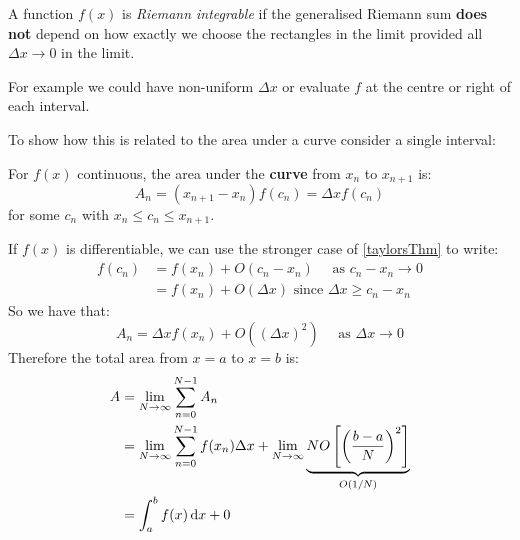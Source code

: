 \documentclass[../main.tex]{subfiles}
\begin{document}
\begin{definition}
  A function $f(x)$ is \textit{Riemann integrable} if the generalised Riemann sum \textbf{does not} depend on how exactly we choose the rectangles in the limit provided all $\Delta x \to 0$ in the limit.

  For example we could have non-uniform $\Delta x$ or evaluate $f$ at the centre or right of each interval.
\end{definition}
To show how this is related to the area under a curve consider a single interval:
\begin{center}
\end{center}
\begin{theorem}
  For $f(x)$ continuous, the area under the \textbf{curve} from $x_n$ to $x_{n + 1}$ is:
  \[
    A_n = (x_{n+1}-x_n)f(c_n) = \Delta x f(c_n)
    \label{meanValue}
  \]
  for some $c_n$ with $x_n \leq c_n \leq x_{n+1}$.
\end{theorem}
If $f(x)$ is differentiable, we can use the stronger case of \cref{taylorsThm} to write:
\begin{align*}
  f(c_n) &= f(x_n) + O(c_n - x_n) \quad \text{ as } c_n - x_n \to 0 \\
         &= f(x_n) + O(\Delta x) \text{ since $\Delta x \geq c_n - x_n$}
\end{align*}
So we have that:
\[
  A_n = \Delta x f(x_n) + O((\Delta x)^2) \quad \text{ as } \Delta x \to 0
\]
Therefore the total area from $x=a$ to $x=b$ is:
\begin{align*}
  A &= \lim_{N \to \infty} \sum_{n=0}^{N-1} A_n \\
    &= \lim_{N \to \infty} \sum_{n=0}^{N-1} f(x_n) \Delta x + \lim_{N \to \infty} \underbrace{NO\left[\left(\frac{b-a}{N}\right)^2\right]}_{O(1/N)} \\
    &= \int_{a}^{b} f(x) \,\mathrm{d} x + 0
\end{align*}
\end{document}
